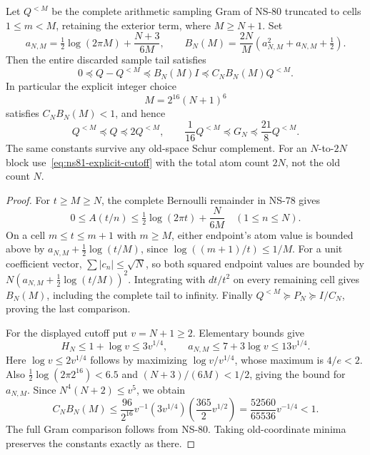 \begin{proposition}
\label{prop:ns81-finite-comparator}
Let $Q^{<M}$ be the complete arithmetic sampling Gram of NS-80 truncated
to cells $1\leq m<M$, retaining the exterior term, where $M\geq N+1$.
Set
\[
 a_{N,M}=\tfrac12\log(2\pi M)+\frac{N+3}{6M},\qquad
 B_N(M)=\frac{2N}{M}\left(a_{N,M}^2+a_{N,M}+\tfrac12\right).
\]
Then the entire discarded sample tail satisfies
\begin{equation}
 0\preceq Q-Q^{<M}\preceq B_N(M)I
                  \preceq C_NB_N(M)Q^{<M}.
 \label{eq:ns81-tail-matrix}
\end{equation}
In particular the explicit integer choice
\begin{equation}
 M=2^{16}(N+1)^6
 \label{eq:ns81-explicit-cutoff}
\end{equation}
satisfies $C_NB_N(M)<1$, and hence
\[
 Q^{<M}\preceq Q\preceq2Q^{<M},\qquad
 \frac1{16}Q^{<M}\preceq G_N\preceq\frac{21}{8}Q^{<M}.
\]
The same constants survive any old-space Schur complement. For an
$N$-to-$2N$ block use~\eqref{eq:ns81-explicit-cutoff} with the total
atom count $2N$, not the old count $N$.
\end{proposition}
\begin{proof}
For $t\geq M\geq N$, the complete Bernoulli remainder in NS-78 gives
\[
 0\leq A(t/n)\leq\tfrac12\log(2\pi t)+\frac{N}{6M}
 \quad(1\leq n\leq N).
\]
On a cell $m\leq t\leq m+1$ with $m\geq M$, either endpoint's
atom value is bounded above by
$a_{N,M}+\tfrac12\log(t/M)$, since
$\log((m+1)/t)\leq1/M$. For a unit coefficient vector,
$\sum|c_n|\leq\sqrt N$, so both squared endpoint values are bounded
by $N(a_{N,M}+\tfrac12\log(t/M))^2$.
Integrating with $dt/t^2$ on every remaining cell gives $B_N(M)$,
including the complete tail to infinity. Finally
$Q^{<M}\succeq P_N\succeq I/C_N$, proving the last comparison.

For the displayed cutoff put $v=N+1\geq2$. Elementary bounds give
\[
 H_N\leq1+\log v\leq3v^{1/4},\qquad
 a_{N,M}\leq7+3\log v\leq13v^{1/4}.
\]
Here $\log v\leq2v^{1/4}$ follows by maximizing
$\log v/v^{1/4}$, whose maximum is $4/e<2$.
Also $\tfrac12\log(2\pi2^{16})<6.5$ and
$(N+3)/(6M)<1/2$, giving the bound for $a_{N,M}$.
Since $N^4(N+2)\leq v^5$, we obtain
\[
 C_NB_N(M)
 \leq\frac{96}{2^{16}}v^{-1}
       (3v^{1/4})\left(\frac{365}{2}v^{1/2}\right)
 =\frac{52560}{65536}v^{-1/4}<1.
\]
The full Gram comparison follows from NS-80. Taking old-coordinate
minima preserves the constants exactly as there.
\end{proof}

